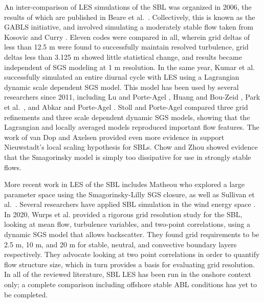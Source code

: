 \documentclass[conf]{new-aiaa}
\begin{document}
An inter-comparison of LES simulations of the SBL was organized in 2006, the
results of which are published in Beare et al.\ \cite{Beare2006}. Collectively,
this is known as the GABLS initiative, and involved simulating a moderately
stable flow taken from Kosovic and Curry \cite{Kosovic2000}. Eleven codes
were compared in all, wherein grid deltas of less than 12.5 m were found to
successfully maintain resolved turbulence, grid deltas less than 3.125 m
showed little statistical change, and results became independent of SGS
modeling at 1 m resolution. In the same year, Kumar et al. \cite{Kumar2006}
successfully simulated an entire diurnal cycle with LES using a Lagrangian
dynamic scale dependent SGS model. This model has been used by several
researchers since 2011, including Lu and Porte-Agel \cite{Lu2011}, Huang
and Bou-Zeid \cite{Huang2013}, Park et al.\ \cite{Park2014}, and
Abkar and Porte-Agel \cite{Abkar2015}. Stoll and Porte-Agel \cite{Stoll2007}
compared three grid refinements and three scale dependent dynamic SGS models,
showing that the Lagrangian and locally averaged models reproduced important
flow features. The work of van Dop and Axelsen \cite{vanDop2007} provided
even more evidence in support Nieuwstadt's local scaling hypothesis for SBLs.
Chow and Zhou \cite{Chow2011} showed evidence that the Smagorinsky model is
simply too dissipative for use in strongly stable flows.

More recent work in LES of the SBL includes Matheou \cite{Matheou2016} who
explored a large parameter space using the Smagorinsky-Lilly SGS
closure, as well as Sullivan et al.\ \cite{sullivan2016turbulent}. Several researchers
have applied SBL simulation in the wind energy space \cite{Aitken2014, Abkar2015, Ghaisas2017}.
In 2020, Wurps et al. \cite{Wurps2020} provided a rigorous grid resolution study for the SBL,
looking at mean flow, turbulence variables, and two-point correlations, using a dynamic
SGS model that allows backscatter. They found grid requirements to be 2.5 m, 10 m, and 20 m
for stable, neutral, and convective boundary layers respectively. They advocate looking
at two point correlations in order to quantify flow structure size, which in turn
provides a basis for evaluating grid resolution. In all of the reviewed literature, SBL LES
has been run in the onshore context only; a complete comparison
including offshore stable ABL conditions has yet to be completed.
\end{document}

